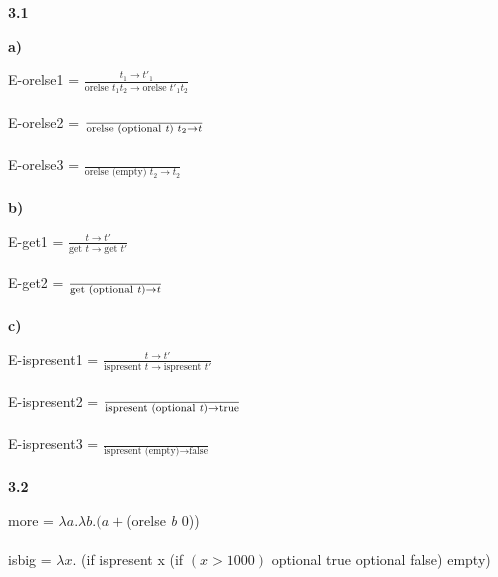 \documentclass[12pt]{article}
\begin{document}
\noindent \textbf{3.1} 

\noindent \textbf{a)} 

\noindent E-orelse1 = $\frac{t_1 \rightarrow t'_1}{\text{orelse }t_1 t_2\rightarrow \text{orelse }t'_1 t_2}$
\\
\\
E-orelse2 = $\frac{}{\text{orelse (optional \emph{t}) } t_2\rightarrow t}$
\\
\\
E-orelse3 = $\frac{}{\text{orelse (empty) } t_2\rightarrow t_2}$
\\
\\
\noindent \textbf{b)}

\noindent E-get1 = $\frac{t \rightarrow t'}{\text{get }t\rightarrow \text{get }t'}$
\\
\\
E-get2 = $\frac{}{\text{get (optional \emph{t})}\rightarrow t}$
\\
\\
\noindent \textbf{c)}

\noindent E-ispresent1 = $\frac{t \rightarrow t'}{\text{ispresent }t\rightarrow \text{ispresent }t'}$
\\
\\
E-ispresent2 = $\frac{}{\text{ispresent (optional \emph{t})}\rightarrow \text{true}}$
\\
\\
E-ispresent3 = $\frac{}{\text{ispresent (empty)}\rightarrow \text{false}}$
\\
\\
\noindent \textbf{3.2} 

\noindent more = $\lambda a.\lambda b.(a+$(orelse \emph{b} 0))
\\
\\
isbig = $\lambda x.$ (if ispresent x (if $(x > 1000)$ optional true optional false) empty)
\end{document}

